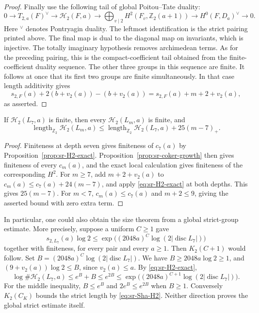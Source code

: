 \begin{proof}
Finally use the following tail of global Poitou--Tate duality:
\[
 0\longrightarrow T_{2,a}(F)^\vee
 \longrightarrow \mathcal H_2(F,a)
 \longrightarrow \bigoplus_{v\mid2}
                    H^2(F_v,\mathbb Z_2(a+1))
 \longrightarrow H^0(F,D_a)^\vee
 \longrightarrow0 .
\]
Here \({}^\vee\) denotes Pontryagin duality.
The leftmost identification is the strict pairing printed above.
The final map is dual to the diagonal map on invariants, which is
injective. The totally imaginary hypothesis removes archimedean
terms. As for the preceding pairing, this is the compact-coefficient
tail obtained from the finite-coefficient duality sequence.
The other three groups in this sequence are finite.
It follows at once that its first two groups are finite
simultaneously. In that case length additivity gives
\[
 s_{2,F}(a)+2(b+v_2(a))-(b+v_2(a))
                  =s_{2,F}(a)+m+2+v_2(a),
\]
as asserted.
\end{proof}

\begin{srproposition}\label{prop:sr-H2-growth}
If \(\mathcal H_2(L_7,a)\) is finite, then every
\(\mathcal H_2(L_m,a)\) is finite, and
\[
 \operatorname{length}_{\mathbb Z_2}\mathcal H_2(L_m,a)
 \leq
 \operatorname{length}_{\mathbb Z_2}\mathcal H_2(L_7,a)
                                      +25(m-7)_+ .
\]
\end{srproposition}
\begin{proof}
Finiteness at depth seven gives finiteness of \(c_7(a)\) by
Proposition~\ref{prop:sr-H2-exact}. Proposition~\ref{prop:sr-coker-growth}
then gives finiteness of every \(c_m(a)\), and the exact local
calculation gives finiteness of the corresponding \(H^2\).
For \(m\geq7\), add \(m+2+v_2(a)\) to
\(c_m(a)\leq c_7(a)+24(m-7)\), and apply
\eqref{eq:sr-H2-exact} at both depths. This gives \(25(m-7)\).
For \(m<7\), \(c_m(a)\leq c_7(a)\) and \(m+2\leq9\),
giving the asserted bound with zero extra term.
\end{proof}

In particular, one could also obtain the size theorem from a global
strict-group estimate.
More precisely, suppose a uniform \(C\geq1\) gave
\[
 s_{2,L_7}(a)\log2\leq
 \exp\bigl((2048a)^C\log(2|\operatorname{disc}L_7|)\bigr)
\]
together with finiteness, for every pair and every \(a\geq1\).
Then \(K_2(C+1)\) would follow. Set
\(B=(2048a)^C\log(2|\operatorname{disc}L_7|)\).
We have \(B\geq2048a\log2\geq1\), and
\((9+v_2(a))\log2\leq B\), since \(v_2(a)\leq a\).
By \eqref{eq:sr-H2-exact},
\[
 \log\#\mathcal H_2(L_7,a)\leq e^B+B
        \leq e^{2B}
        \leq
 \exp\bigl((2048a)^{C+1}\log(2|\operatorname{disc}L_7|)\bigr).
\]
For the middle inequality, \(B\leq e^B\) and
\(2e^B\leq e^{2B}\) when \(B\geq1\).
Conversely \(K_2(C_K)\) bounds the strict length by
\eqref{eq:sr-Sha-H2}. Neither direction proves the global strict
estimate itself.

